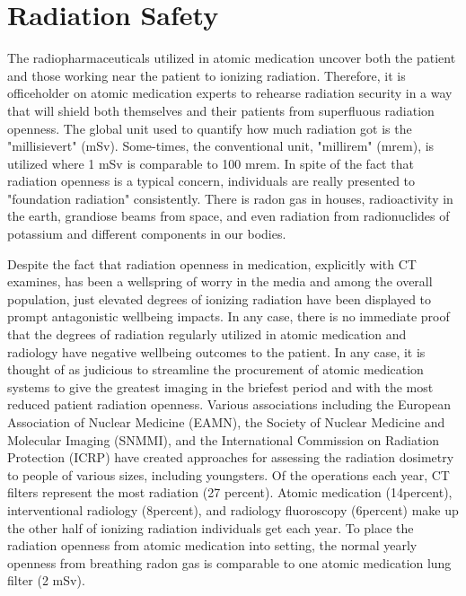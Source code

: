 \documentclass[12pt]{article}
\begin{document}
\section{Radiation Safety}
The radiopharmaceuticals utilized in atomic medication uncover both the patient and those working near the patient to ionizing radiation. Therefore, it is officeholder on atomic medication experts to rehearse radiation security in a way that will shield both themselves and their patients from superfluous radiation openness.
The global unit used to quantify how much radiation got is the "millisievert" (mSv). Some-times, the conventional unit, "millirem" (mrem), is utilized where 1 mSv is comparable to 100 mrem. In spite of the fact that radiation openness is a typical concern, individuals are really presented to "foundation radiation" consistently. There is radon gas in houses, radioactivity in the earth, grandiose beams from space, and even radiation from radionuclides of potassium and different components in our bodies.
\par
Despite the fact that radiation openness in medication, explicitly with CT examines, has been a wellspring of worry in the media and among the overall population, just elevated degrees of ionizing radiation have been displayed to prompt antagonistic wellbeing impacts. In any case, there is no immediate proof that the degrees of radiation regularly utilized in atomic medication and radiology have negative wellbeing outcomes to the patient. In any case, it is thought of as judicious to streamline the procurement of atomic medication systems to give the greatest imaging in the briefest period and with the most reduced patient radiation openness. Various associations including the European Association of Nuclear Medicine (EAMN), the Society of Nuclear Medicine and Molecular Imaging (SNMMI), and the International Commission on Radiation Protection (ICRP) have created approaches for assessing the radiation dosimetry to people of various sizes, including youngsters. Of the operations each year, CT filters represent the most radiation (27 percent). Atomic medication (14percent), interventional radiology (8percent), and radiology fluoroscopy (6percent) make up the other half of ionizing radiation individuals get each year. To place the radiation openness from atomic medication into setting, the normal yearly openness from breathing radon gas is comparable to one atomic medication lung filter (2 mSv).

\par
\end{document}
